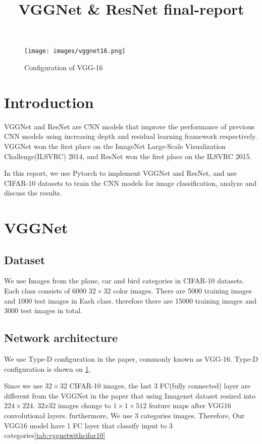 \documentclass[extendedabs]{bmvc2k}
\begin{document}
\title{VGGNet \& ResNet final-report}

 
\maketitle
\noindent

\begin{figure}[t]
	\texttt{[image: images/vggnet16.png]}
	\caption{Configuration of VGG-16}
 \label{fig:VGGNet16}
	\vspace{-2mm}
\end{figure}

\section{Introduction}
VGGNet\cite{vggnet_paper} and ResNet\cite{resnet_paper} are CNN models that improve the performance of previous CNN models using increasing depth and residual learning framework respectively. VGGNet won the first place on the ImageNet Large-Scale Visualization Challenge(ILSVRC) 2014, and ResNet won the first place on the ILSVRC 2015. 

In this report, we use Pytorch to implement VGGNet and ResNet, and use CIFAR-10\cite{cifar10} datasets to train the CNN models for image classification, analyze and discuss the results.

\section{VGGNet}
\subsection{Dataset}
We use Images from the plane, car and bird categories in CIFAR-10 datasets. Each class consists of 6000 $32\times32$ color images. There are 5000 training images and 1000 test images in Each class. therefore there are 15000 training images and 3000 test images in total.
\subsection{Network architecture}
We use Type-D configuration in the paper\cite{vggnet_paper}, commonly known as VGG-16. Type-D configuration is shown on \ref{fig:VGGNet16}.

Since we use $32\times32$ CIFAR-10 images, the last 3 FC(fully connected) layer are different from the VGGNet in the paper\cite{vggnet_paper} that using Imagenet dataset resized into $224\times224$. $32x32$ images change to $1\times1\times512$ feature maps after VGG16 convolutional layers. furthermore, We use 3 categories images. Therefore, Our VGG16 model have 1 FC layer that classify input to 3 categories\ref{tab:vggnetwithcifar10}
\end{document}
